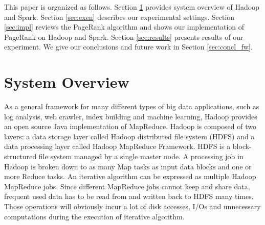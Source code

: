\documentclass[12pt,conference,letterpaper]{IEEEtran}
\begin{document}
This paper is organized as follows. Section \ref{sec:sys_ov} provides system overview of Hadoop and Spark. Section \ref{sec:exen} describes our experimental settings. Section \ref{sec:impl} reviews the PageRank algorithm and shows our implementation of PageRank on Hadoop and Spark. Section \ref{sec:results} presents results of our experiment. We give our conclusions and future work in Section \ref{sec:concl_fw}.



\section{System Overview}
\label{sec:sys_ov}

As a general framework for many different types of big data applications, such as log analysis, web crawler, index building and machine learning, Hadoop\cite{url_hadoop} provides an open source Java implementation of MapReduce. Hadoop is composed of two layers: a data storage layer called Hadoop distributed file system (HDFS) and a data processing layer called Hadoop MapReduce Framework. HDFS is a block-structured file system managed by a single master node.  A processing job in Hadoop is broken down to as many Map tasks as input data blocks and one or more Reduce tasks. An iterative algorithm can be expressed as multiple Hadoop MapReduce jobs. Since different MapReduce jobs cannot keep and share data, frequent used data has to be read from and written back to HDFS many times. Those operations will obviously incur a lot of disk accesses, I/Os and unnecessary computations \cite{jaliya2010} \cite{yingyi2010} \cite{yanfeng2011} during the execution of iterative algorithm.
\end{document}

